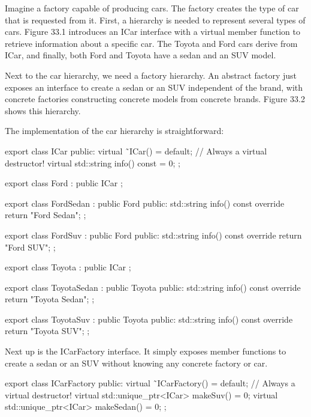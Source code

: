 
Imagine a factory capable of producing cars. The factory creates the type of car that is requested from it. First, a hierarchy is needed to represent several types of cars. Figure 33.1 introduces an ICar interface with a virtual member function to retrieve information about a specific car. The Toyota and Ford cars derive from ICar, and finally, both Ford and Toyota have a sedan and an SUV model.

Next to the car hierarchy, we need a factory hierarchy. An abstract factory just exposes an interface to create a sedan or an SUV independent of the brand, with concrete factories constructing concrete models from concrete brands. Figure 33.2 shows this hierarchy.




The implementation of the car hierarchy is straightforward:

\begin{cpp}
export class ICar
{
    public:
    virtual ˜ICar() = default; // Always a virtual destructor!
    virtual std::string info() const = 0;
};

export class Ford : public ICar { };

export class FordSedan : public Ford
{
    public:
    std::string info() const override { return "Ford Sedan"; }
};

export class FordSuv : public Ford
{
    public:
    std::string info() const override { return "Ford SUV"; }
};

export class Toyota : public ICar { };

export class ToyotaSedan : public Toyota
{
    public:
    std::string info() const override { return "Toyota Sedan"; }
};

export class ToyotaSuv : public Toyota
{
    public:
    std::string info() const override { return "Toyota SUV"; }
};
\end{cpp}

Next up is the ICarFactory interface. It simply exposes member functions to create a sedan or an SUV without knowing any concrete factory or car.

\begin{cpp}
export class ICarFactory
{
    public:
        virtual ˜ICarFactory() = default; // Always a virtual destructor!
        virtual std::unique_ptr<ICar> makeSuv() = 0;
        virtual std::unique_ptr<ICar> makeSedan() = 0;
};
\end{cpp}

